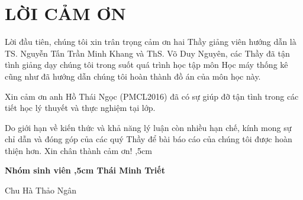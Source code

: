 \documentclass[12pt,a4paper,oneside]{book}
\begin{document}
\newpage

\newpage
\def\@chapter[#1]#2{\ifnum \c@secnumdepth >\m@ne
                       \if@mainmatter
                         \refstepcounter{chapter}%
                         \typeout{\@chapapp\space\thechapter.}%
                         \addcontentsline{toc}{chapter}%
                              {\bf  Chương \protect\numberline{\thechapter. } #1}%
                       \else
                         \addcontentsline{toc}{chapter}{ #1}%
                       \fi
                    \else
                      \addcontentsline{toc}{chapter}{ #1}%
                    \fi
                    \chaptermark{#1}%
                    \addtocontents{lof}{\protect\addvspace{10\p@}}%
                    \addtocontents{lot}{\protect\addvspace{10\p@}}%
                    \if@twocolumn
                      \@topnewpage[\@makechapterhead{#2}]%
                    \else
                      \@makechapterhead{#2}%
                      \@afterheading
                    \fi}
\tableofcontents
{}

\makeatletter
{}%
\makeatother

\renewcommand*{\listfigurename}{DANH MỤC HÌNH ẢNH}
\listoffigures
\thispagestyle{empty}

\renewcommand*{\listtablename}{DANH MỤC BẢNG BIỂU}
\listoftables
\thispagestyle{empty}

\pagestyle{plain}
\chapter*{LỜI CẢM ƠN}
	Lời đầu tiên, chúng tôi xin trân trọng cảm ơn hai Thầy giảng viên hướng dẫn là TS. Nguyễn Tấn Trần Minh Khang và ThS. Võ Duy Nguyên, các Thầy đã tận tình giảng dạy chúng tôi trong suốt quá trình học tập môn Học máy thống kê cũng như đã hướng dẫn chúng tôi hoàn thành đồ án của môn học này.
	
	Xin cảm ơn anh Hồ Thái Ngọc (PMCL2016) đã có sự giúp đỡ tận tình trong các tiết học lý thuyết và thực nghiệm tại lớp.
	
	Do giới hạn về kiến thức và khả năng lý luận còn nhiều hạn chế, kính mong sự chỉ dẫn và đóng góp của các quý Thầy để bài báo cáo của chúng tôi được hoàn thiện hơn. Xin chân thành cảm ơn!
	,5cm
	\hskip 9cm {\bf Nhóm sinh viên
	,5cm
	\hskip 9cm Thái Minh Triết
	
	\hskip 8.6cm Chu Hà Thảo Ngân
	}
\end{document}
